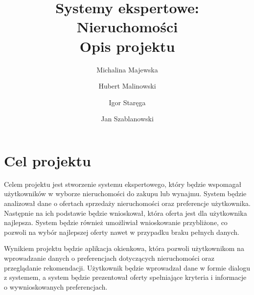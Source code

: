 \documentclass{article}
\title{Systemy ekspertowe: Nieruchomości \\ \large{Opis projektu}}
\author{Michalina Majewska
	\and Hubert Malinowski
	\and Igor Staręga
	\and Jan Szablanowski}
\begin{document}
\maketitle
\tableofcontents

\vspace{2cm}

\section{Cel projektu}
Celem projektu jest stworzenie systemu ekspertowego, który będzie wspomagał użytkowników w wyborze nieruchomości do zakupu lub wynajmu. System będzie analizował dane o ofertach sprzedaży nieruchomości oraz preferencje użytkownika. Następnie na ich podstawie będzie wnioskował, która oferta jest dla użytkownika najlepsza. System będzie również umożliwiał wnioskowanie przybliżone, co pozwoli na wybór najlepszej oferty nawet w przypadku braku pełnych danych.

Wynikiem projektu będzie aplikacja okienkowa, która pozwoli użytkownikom na wprowadzanie danych o preferencjach dotyczących nieruchomości oraz przeglądanie rekomendacji. Użytkownik będzie wprowadzał dane w formie dialogu z systemem, a system będzie prezentował oferty spełniające kryteria i informacje o wywnioskowanych preferencjach.




\end{document}
